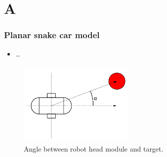 \section{A}

\begin{frame}
	\frametitle{Planar snake car model}
	\begin{itemize}
		\item \dots
	\end{itemize}
\end{frame}

\begin{frame}
	\frametitle{}
	\begin{figure}
		\centering
		\includegraphics[width=0.5\textwidth]{img/angle.pdf}
		\caption{Angle between robot head module and target.}
		\label{fig:angle}
	\end{figure}
\end{frame}
